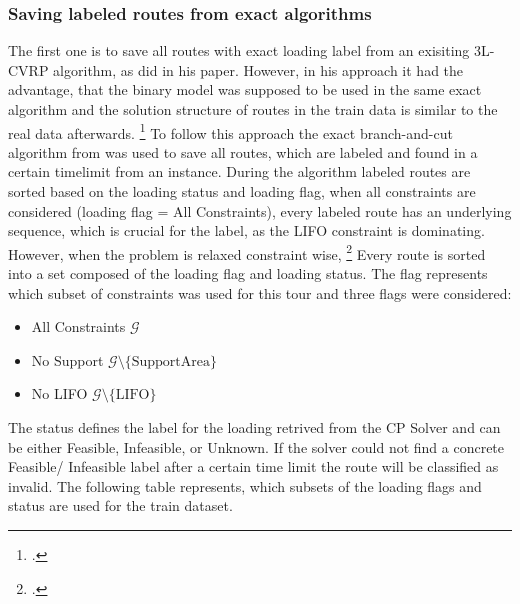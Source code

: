 \subsubsection{Saving labeled routes from exact algorithms}
The first one is to save all routes with exact loading label from an exisiting \gls{3L-CVRP}
algorithm, as \cite{zhang_learning-based_2022} did in his paper. However, in his approach it
had the advantage, that the binary model was supposed to be used in the same exact algorithm
and the solution structure of routes in the train data is similar to the real data afterwards. \footcite[cf.][]{zhang_learning-based_2022}
To follow this approach the exact branch-and-cut algorithm from \cite{tamke_branch-and-cut_2024} was
used to save all routes, which are labeled and found in a certain timelimit from an instance. During
the algorithm labeled routes are sorted based on the loading status and loading flag, when all
constraints are considered (loading flag = All Constraints), every labeled route has an underlying
sequence, which is crucial for the label, as the \gls{LIFO} constraint is dominating. However,
when the problem is relaxed constraint wise,
\footcites[Retrieved from][]{tamke_repository_2024}[cf.][]{tamke_branch-and-cut_2024} Every route
is sorted into a set composed of the loading flag and loading status. The flag represents which
subset of constraints was used for this tour and three flags were considered:
\begin{itemize}
    \item All Constraints $\mathcal{G}$
    \item No Support $\mathcal{G}\setminus \{\text{SupportArea}\}$
    \item No LIFO $\mathcal{G}\setminus \{\text{LIFO}\}$
\end{itemize}

The status defines the label for the loading retrived from the \gls{CP} Solver and can be either
Feasible, Infeasible, or Unknown. If the solver could not find a concrete Feasible/ Infeasible
label after a certain time limit the route will be classified as invalid. The following table
represents, which subsets of the loading flags and status are used for the train dataset.

